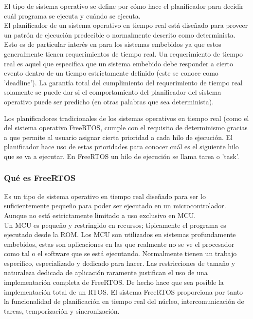 El tipo de sistema operativo se define por cómo hace el planificador para decidir cuál programa se ejecuta y cuándo se ejecuta. \\

El planificador de un sistema operativo en tiempo real está diseñado para proveer un patrón de ejecución predecible o normalmente descrito como determinista. Esto es de particular interés en para los sistemas embebidos ya que estos generalmente tienen requerimientos de tiempo real. Un requerimiento de tiempo real es aquel que especifica que un sistema embebido debe responder a cierto evento dentro de un tiempo estrictamente definido (este se conoce como 'deadline'). La garantía total del cumplimiento del requerimiento de tiempo real solamente se puede dar si el comportamiento del planificador del sistema operativo puede ser predicho (en otras palabras que sea determinista).

Los planificadores tradicionales de los sistemas operativos en tiempo real (como el del sistema operativo FreeRTOS, cumple con el requisito de determinismo gracias a que permite al usuario asignar cierta prioridad a cada hilo de ejecución. El planificador hace uso de estas prioridades para conocer cuál es el siguiente hilo que se va a ejecutar. En FreeRTOS un hilo de ejecución se llama tarea o 'task'.\\

\subsubsection{Qué es FreeRTOS}

Es un tipo de sistema operativo en tiempo real diseñado para ser lo suficientemente pequeño para poder ser ejecutado en un microcontrolador. Aunque no está estrictamente limitado a uso exclusivo en MCU. \\

Un MCU es pequeño y restringido en recursos; típicamente el programa es ejecutado desde la ROM. Los MCU son utilizados en sistemas profundamente embebidos, estas son aplicaciones en las que realmente no se ve el procesador como tal o el software que se está ejecutando. Normalmente tienen un trabajo especifico, especializado y dedicado para hacer. Las restricciones de tamaño y naturaleza dedicada de aplicación raramente justifican el uso de una implementación completa de FreeRTOS. De hecho hace que sea posible la implementación total de un RTOS. El sistema FreeRTOS proporciona por tanto la funcionalidad de planificación en tiempo real del núcleo, intercomunicación de tareas, temporización y sincronización. 



